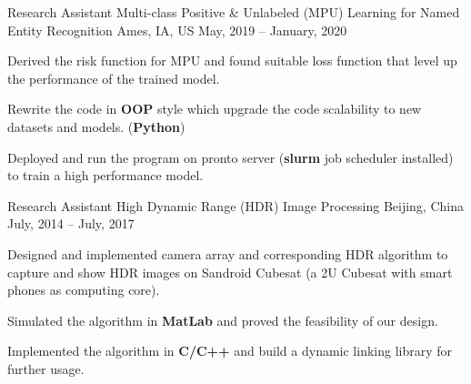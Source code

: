 



\begin{cventries}
  \cventry
    {Research Assistant}
    {Multi-class Positive \& Unlabeled (MPU) Learning for Named Entity Recognition}
    {Ames, IA, US}
    {May, 2019 -- January, 2020}
    {
      \begin{cvitems}
        \item {Derived the risk function for MPU and found suitable loss function that level up the performance of the trained model. }
        \item {Rewrite the code in \textbf{OOP} style which upgrade the code scalability to new datasets and models. (\textbf{Python})}
        \item {Deployed and run the program on pronto server (\textbf{slurm} job scheduler installed) to train a high performance model. }
      \end{cvitems}
    }
  \cventry
    {Research Assistant}
    {High Dynamic Range (HDR) Image Processing}
    {Beijing, China}
    {July, 2014 -- July, 2017}
    {
      \begin{cvitems}
        \item {Designed and implemented camera array and corresponding HDR algorithm to capture and show HDR images on Sandroid Cubesat (a 2U Cubesat with smart phones as computing core).}
        \item {Simulated the algorithm in \textbf{MatLab} and proved the feasibility of our design.}
        \item {Implemented the algorithm in \textbf{C/C++} and build a dynamic linking library for further usage. }
      \end{cvitems}
    }
    

\end{cventries}
